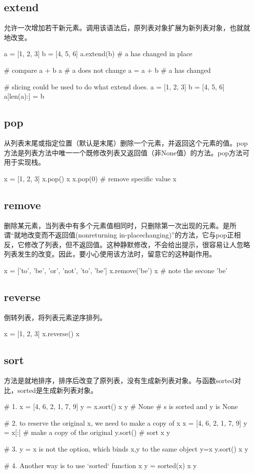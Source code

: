 \subsection{extend}
允许一次增加若干新元素。调用该语法后，原列表对象扩展为新列表对象，也就就地改变。
\begin{python}
a = [1, 2, 3]
b = [4, 5, 6]
a.extend(b)  # a has changed in place

# compare
a + b
a  # a does not change
a = a + b # a has changed

# slicing could be used to do what extend does.
a = [1, 2, 3]
b = [4, 5, 6]
a[len(a):] = b
\end{python}
\subsection{pop}
从列表末尾或指定位置（默认是末尾）删除一个元素，并返回这个元素的值。pop方法是列表方法中唯一一个既修改列表又返回值（非None值）的方法。pop方法可用于实现栈。
\begin{python}
x = [1, 2, 3]
x.pop()
x
x.pop(0)  # remove specific value
x
\end{python}
\subsection{remove}
删除某元素，当列表中有多个元素值相同时，只删除第一次出现的元素。是所谓“就地改变而不返回值(nonreturning in-placechanging)”的方法，它与pop正相反，它修改了列表，但不返回值。这种静默修改，不会给出提示，很容易让人忽略列表发生的改变。因此，要小心使用该方法时，留意它的这种副作用。
\begin{python}
x = ['to', 'be', 'or', 'not', 'to', 'be']
x.remove('be')
x
# note the secone 'be'
\end{python}
\subsection{reverse}
倒转列表，将列表元素逆序排列。
\begin{python}
x = [1, 2, 3]
x.reverse()
x
\end{python}
\subsection{sort}
方法是就地排序，排序后改变了原列表，没有生成新列表对象。与函数sorted对比，sorted是生成新列表对象。
\begin{python}
  # 1.
  x = [4, 6, 2, 1, 7, 9]
  y = x.sort()
  x
  y # None
  # s is sorted and y is None

  # 2. to reserve the original x, we need to make a copy of x
  x = [4, 6, 2, 1, 7, 9]
  y = x[:]  # make a copy of the original
  y.sort()  # sort
  x
  y

  # 3. y = x is not the option, which binds x,y to the same object
  y=x
  y.sort()
  x
  y

  # 4. Another way is to use `sorted` function
  x
  y = sorted(x)
  x
  y
\end{python}
